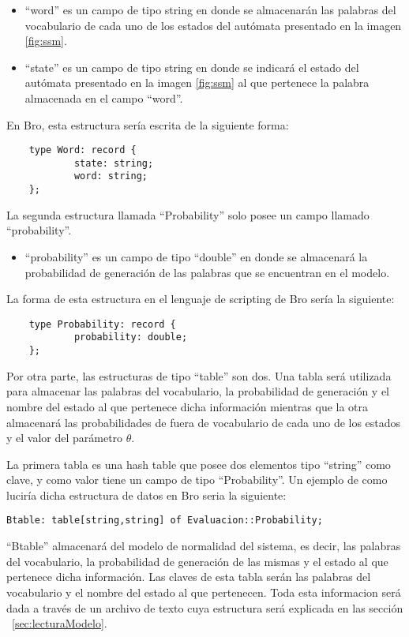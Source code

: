 \begin{itemize}
\item “word” es un campo de tipo string en donde se almacenarán las palabras del vocabulario de cada uno de los estados del autómata presentado en la imagen \ref{fig:ssm}.
\item “state” es un campo de tipo string en donde se indicará el estado del autómata presentado en la imagen \ref{fig:ssm} al que pertenece la palabra almacenada en el campo “word”.
\end{itemize}

En Bro, esta estructura sería escrita de la siguiente forma:

\begin{verbatim}
    type Word: record {
            state: string;
            word: string;
    };
\end{verbatim}

La segunda estructura llamada “Probability” solo posee un campo llamado “probability”.

\begin{itemize}
\item “probability” es un campo de tipo “double” en donde se almacenará la probabilidad de generación de las palabras que se encuentran en el modelo.
\end{itemize}

La forma de esta estructura en el lenguaje de scripting de Bro sería la siguiente:
\begin{verbatim}
    type Probability: record {
            probability: double;
    };
\end{verbatim}

Por otra parte, las estructuras de tipo “table” son dos. Una tabla será utilizada para almacenar las palabras del vocabulario, la probabilidad de generación y el nombre del estado al que pertenece dicha información mientras que la otra almacenará las probabilidades de fuera de vocabulario de cada uno de los estados y el valor del parámetro $\theta$.

La primera tabla es una hash table que posee dos elementos tipo “string” como clave, y como valor tiene un campo de tipo “Probability”. Un ejemplo de como luciría dicha estructura de datos en Bro seria la siguiente:

\begin{verbatim}
Btable: table[string,string] of Evaluacion::Probability;
\end{verbatim}

“Btable” almacenará del modelo de normalidad del sistema, es decir, las palabras del vocabulario, la probabilidad de generación de las mismas y el estado al que pertenece dicha información. Las claves de esta tabla serán las palabras del vocabulario y el nombre del estado al que pertenecen. Toda esta informacion será dada a través de un archivo de texto cuya estructura será explicada en las sección ~\ref{sec:lecturaModelo}.

